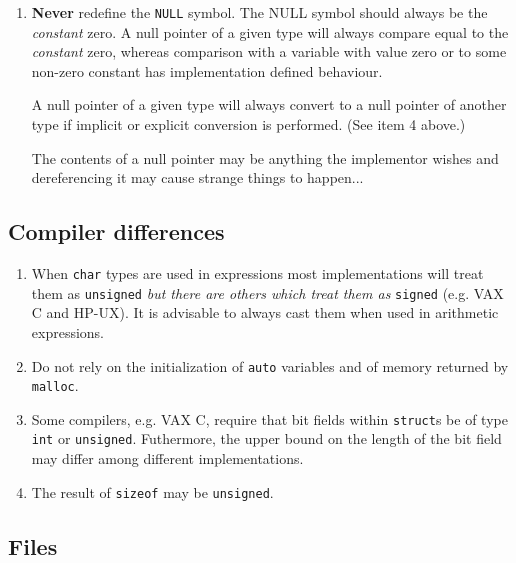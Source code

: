 \begin{enumerate}
\item {\bf Never} redefine the {\tt NULL} symbol. The NULL symbol should
 always be the {\em constant} zero. A null pointer of a given type will
 always compare equal to the {\em constant} zero, whereas comparison
 with a variable with value zero or to some non-zero constant has
 implementation defined behaviour.

 A null pointer of a given type will always convert to a null
 pointer of another type if implicit or explicit conversion is performed.
 (See item 4 above.)

 The contents of a null pointer may be anything the
 implementor wishes and dereferencing it may cause strange things to
 happen...

\end{enumerate}

\subsection{Compiler differences}

\begin{enumerate}

\item When {\tt char} types are used in expressions most implementations
 will treat them as {\tt unsigned} {\em but there are others which treat
 them as} {\tt signed} (e.g. VAX C and HP-UX).
 It is advisable to always cast them when used in arithmetic expressions.

\item Do not rely on the initialization of {\tt auto} variables and
 of memory returned by {\tt malloc}.

\item Some compilers, e.g. VAX C, require that bit fields within {\tt struct}s
 be of type {\tt int} or {\tt unsigned}. Futhermore, the upper bound on
 the length of the bit field may differ among different implementations.

\item The result of {\tt sizeof} may be {\tt unsigned}.

\end{enumerate}

\subsection{Files}

